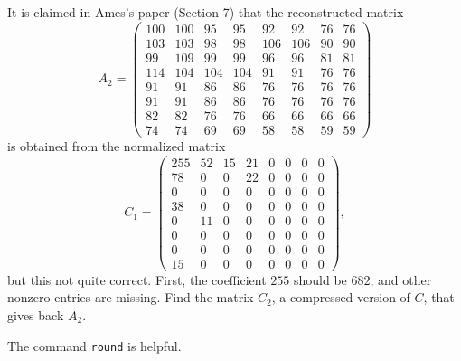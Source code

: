 \documentclass[12pt]{article}
\begin{document}
\medskip
It is claimed in Ames's paper (Section 7) that the reconstructed  matrix
\[
A_2 =
\begin{pmatrix}
100  &  100  &   95  &   95  &   92  &   92  &   76  &   76 \\
   103 &   103  &   98  &   98  &  106  &  106  &   90  &   90 \\
    99  &  109  &   99  &   99  &   96  &   96  &   81  &   81 \\
   114  &  104  &  104  &  104  &   91  &   91  &   76  &   76 \\
    91  &   91  &   86  &   86  &   76  &   76  &   76  &   76 \\
    91  &   91  &   86  &   86  &   76  &   76  &   76  &   76 \\
    82  &   82  &   76  &   76  &   66  &   66  &   66  &   66 \\
    74  &   74  &   69  &   69  &   58  &   58  &   59  &  59
\end{pmatrix}
\]
is obtained from the normalized matrix
\[
C_1 =
\begin{pmatrix}
255  &  52  &   15  &  21  &  0  &  0  &  0  &  0 \\
78   &    0   &    0   &  22  &  0  &  0  &  0  &  0 \\
0     &    0   &    0   &    0  &  0  &  0  &  0  &  0 \\
38     &    0   &    0   &    0  &  0  &  0  &  0  &  0 \\
0     &   11  &    0   &    0  &  0  &  0  &  0  &  0 \\
0     &    0   &    0   &    0  &  0  &  0  &  0  &  0 \\
0     &    0   &    0   &    0  &  0  &  0  &  0  &  0 \\
15     &    0   &    0   &    0  &  0  &  0  &  0  &  0 
\end{pmatrix},
\]
but this not quite correct. First, the coefficient $255$ should be
$682$, and other nonzero entries are missing.
Find the matrix $C_2$, a compressed version of $C$, that gives back
$A_2$.

\medskip
\hint
The command {\tt round} is helpful.
\end{document}

